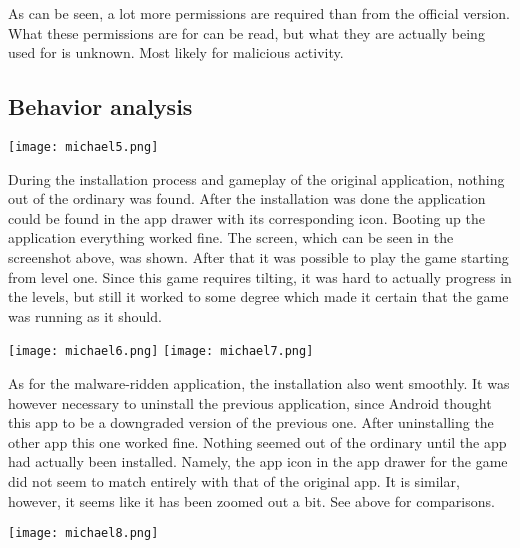 As can be seen, a lot more permissions are required than from the official version. What these permissions are for can be read, but what they are actually being used for is unknown. Most likely for malicious activity.
\newpage
\subsection{Behavior analysis}


\texttt{[image: michael5.png]}

During the installation process and gameplay of the original application, nothing out of the ordinary was found. After the installation was done the application could be found in the app drawer with its corresponding icon. Booting up the application everything worked fine. The screen, which can be seen in the screenshot above, was shown. After that it was possible to play the game starting from level one. Since this game requires tilting, it was hard to actually progress in the levels, but still it worked to some degree which made it certain that the game was running as it should.


\texttt{[image: michael6.png]}
\texttt{[image: michael7.png]}


As for the malware-ridden application, the installation also went smoothly. It was however necessary to uninstall the previous application, since Android thought this app to be a downgraded version of the previous one. After uninstalling the other app this one worked fine. Nothing seemed out of the ordinary until the app had actually been installed. Namely, the app icon in the app drawer for the game did not seem to match entirely with that of the original app. It is similar, however, it seems like it has been zoomed out a bit. See above for comparisons.

\texttt{[image: michael8.png]}

